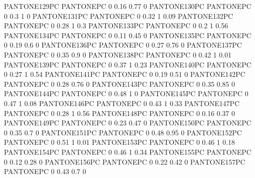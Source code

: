  {PANTONE129PC} {PANTONE\SpotSpace PC} {0 0.16 0.77 0}
 {PANTONE130PC} {PANTONE\SpotSpace PC} {0 0.3 1 0}
 {PANTONE131PC} {PANTONE\SpotSpace PC} {0 0.32 1 0.09}
 {PANTONE132PC} {PANTONE\SpotSpace PC} {0 0.28 1 0.3}
 {PANTONE133PC} {PANTONE\SpotSpace PC} {0 0.2 1 0.56}
 {PANTONE134PC} {PANTONE\SpotSpace PC} {0 0.11 0.45 0}
 {PANTONE135PC} {PANTONE\SpotSpace PC} {0 0.19 0.6 0}
 {PANTONE136PC} {PANTONE\SpotSpace PC} {0 0.27 0.76 0}
 {PANTONE137PC} {PANTONE\SpotSpace PC} {0 0.35 0.9 0}
 {PANTONE138PC} {PANTONE\SpotSpace PC} {0 0.42 1 0.01}
 {PANTONE139PC} {PANTONE\SpotSpace PC} {0 0.37 1 0.23}
 {PANTONE140PC} {PANTONE\SpotSpace PC} {0 0.27 1 0.54}
 {PANTONE141PC} {PANTONE\SpotSpace PC} {0 0.19 0.51 0}
 {PANTONE142PC} {PANTONE\SpotSpace PC} {0 0.28 0.76 0}
 {PANTONE143PC} {PANTONE\SpotSpace PC} {0 0.35 0.85 0}
 {PANTONE144PC} {PANTONE\SpotSpace PC} {0 0.48 1 0}
 {PANTONE145PC} {PANTONE\SpotSpace PC} {0 0.47 1 0.08}
 {PANTONE146PC} {PANTONE\SpotSpace PC} {0 0.43 1 0.33}
 {PANTONE147PC} {PANTONE\SpotSpace PC} {0 0.28 1 0.56}
 {PANTONE148PC} {PANTONE\SpotSpace PC} {0 0.16 0.37 0}
 {PANTONE149PC} {PANTONE\SpotSpace PC} {0 0.23 0.47 0}
 {PANTONE150PC} {PANTONE\SpotSpace PC} {0 0.35 0.7 0}
 {PANTONE151PC} {PANTONE\SpotSpace PC} {0 0.48 0.95 0}
 {PANTONE152PC} {PANTONE\SpotSpace PC} {0 0.51 1 0.01}
 {PANTONE153PC} {PANTONE\SpotSpace PC} {0 0.46 1 0.18}
 {PANTONE154PC} {PANTONE\SpotSpace PC} {0 0.46 1 0.34}
 {PANTONE155PC} {PANTONE\SpotSpace PC} {0 0.12 0.28 0}
 {PANTONE156PC} {PANTONE\SpotSpace PC} {0 0.22 0.42 0}
 {PANTONE157PC} {PANTONE\SpotSpace PC} {0 0.43 0.7 0}
